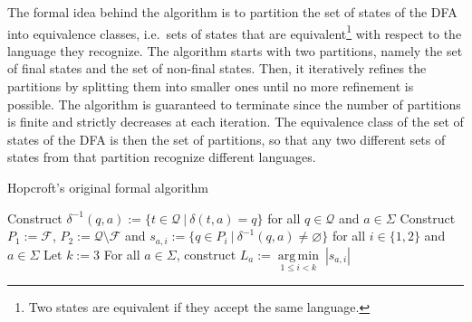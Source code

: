 \documentclass[12pt, a4 paper]{article}
\theoremstyle{definition}
\begin{document}
The formal idea behind the algorithm is to partition the set of states of the DFA into equivalence classes, i.e.\ sets of states that are equivalent\footnote{Two states are equivalent if they accept the same language.} with respect to the language they recognize.
The algorithm starts with two partitions, namely the set of final states and the set of non-final states.
Then, it iteratively refines the partitions by splitting them into smaller ones until no more refinement is possible.
The algorithm is guaranteed to terminate since the number of partitions is finite and strictly decreases at each iteration.
The equivalence class of the set of states of the DFA is then the set of partitions, so that any two different sets of states from that partition recognize different languages.

\bigskip

\begin{algorithm}[H]
\SetAlgoLined
\caption{Hopcroft's original formal algorithm}
\label{alg:original}
Construct $\delta^{-1}(q, a) := \{t \in \mathcal{Q}\ |\ \delta(t, a) = q\}$ for all $q \in \mathcal{Q}$ and $a \in \Sigma$ \;\label{alg:original:1}
Construct $P_1 := \mathcal{F}$, $P_2 := \mathcal{Q} \setminus \mathcal{F}$ and $s_{a,i} := \{q \in P_i \ | \ \delta^{-1}(q, a) \neq \varnothing \}$ for all $i \in \{1, 2\}$ and $a \in \Sigma$ \;
Let $k := 3$ \;
For all $a \in \Sigma$, construct $L_a := \underset{1 \leq i < k}{\operatorname*{arg\,min}}\ \left| s_{a, i} \right|$ \; \label{alg:original:4}
\end{algorithm}
\end{document}
